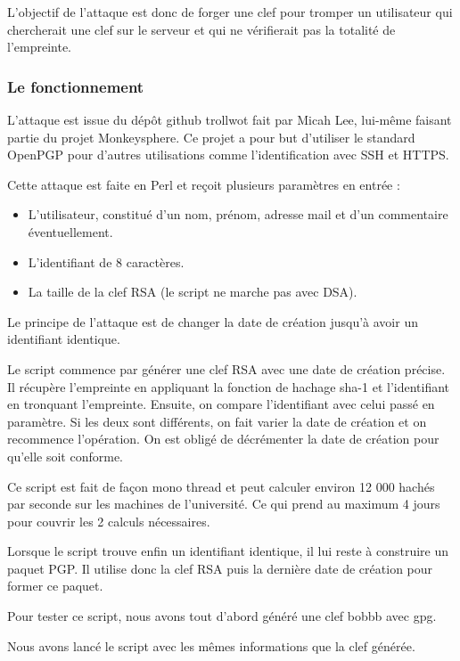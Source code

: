 \documentclass{../res/univ-projet}
\begin{document}
  L'objectif de l'attaque est donc de forger une clef pour tromper un utilisateur qui chercherait une clef sur le serveur et qui ne vérifierait pas la totalité de l'empreinte.
  
  \subsubsection{Le fonctionnement}

  L'attaque est issue du dépôt github trollwot fait par Micah Lee, lui-même faisant partie du projet Monkeysphere. Ce projet a pour but d'utiliser le standard OpenPGP pour d'autres utilisations comme l'identification avec SSH et HTTPS.
  
  Cette attaque est faite en Perl et reçoit plusieurs paramètres en entrée :
  
  \begin{itemize}
  	\item L'utilisateur, constitué d'un nom, prénom, adresse mail et d'un commentaire éventuellement. 
	\item L'identifiant de 8 caractères.
	\item La taille de la clef RSA (le script ne marche pas avec DSA).
  \end{itemize}

  Le principe de l'attaque est de changer la date de création jusqu'à avoir un identifiant identique.
  
  Le script commence par générer une clef RSA avec une date de création précise. Il récupère l'empreinte en appliquant la fonction de hachage sha-1 et l'identifiant en tronquant l'empreinte. Ensuite, on compare l'identifiant avec celui passé en paramètre. Si les deux sont différents, on fait varier la date de création et on recommence l'opération. On est obligé de décrémenter la date de création pour qu'elle soit conforme.
  
  Ce script est fait de façon mono thread et peut calculer environ 12 000 hachés par seconde sur les machines de l'université. Ce qui prend au maximum 4 jours pour couvrir les 2  calculs nécessaires. 
  
  Lorsque le script trouve enfin un identifiant identique, il lui reste à construire un paquet PGP. Il utilise donc la clef RSA puis la dernière date de création pour former ce paquet.
    
  Pour tester ce script, nous avons tout d'abord généré une clef bobbb avec gpg.	  
  
  Nous avons lancé le script avec les mêmes informations que la clef générée.
  
\end{document}
